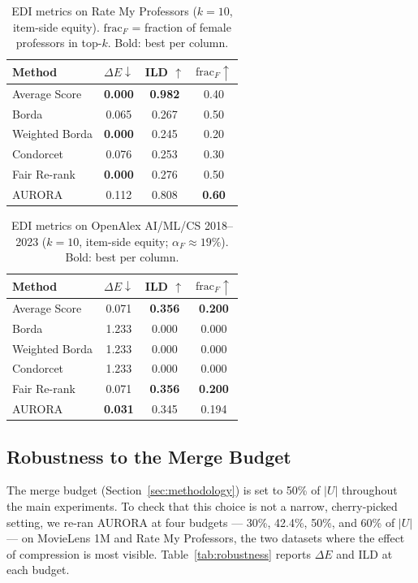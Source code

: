 \documentclass[a4paper,fleqn]{cas-dc}
\begin{document}
\begin{table}[h!]
\caption{EDI metrics on Rate My Professors ($k=10$, item-side equity).
$\mathrm{frac}_F$ = fraction of female professors in top-$k$.
Bold: best per column.}
\label{tab:rmp}
\centering
\begin{tabular}{lccc}
\hline
Method & $\Delta E \downarrow$ & ILD $\uparrow$ &
$\mathrm{frac}_F \uparrow$ \\
\hline
Average Score  & \textbf{0.000} & \textbf{0.982} & 0.40 \\
Borda          & 0.065 & 0.267 & 0.50 \\
Weighted Borda & \textbf{0.000} & 0.245 & 0.20 \\
Condorcet      & 0.076 & 0.253 & 0.30 \\
Fair Re-rank   & \textbf{0.000} & 0.276 & 0.50 \\
AURORA           & 0.112 & 0.808 & \textbf{0.60} \\
\hline
\end{tabular}
\end{table}
\begin{table}[h!]
\caption{EDI metrics on OpenAlex AI/ML/CS 2018--2023 ($k=10$, item-side equity;
$\alpha_F \approx 19\%$). Bold: best per column.}
\label{tab:oalex}
\centering
\begin{tabular}{lccc}
\hline
Method & $\Delta E \downarrow$ & ILD $\uparrow$ &
$\mathrm{frac}_F \uparrow$ \\
\hline
Average Score  & 0.071 & \textbf{0.356} & \textbf{0.200} \\
Borda          & 1.233 & 0.000 & 0.000 \\
Weighted Borda & 1.233 & 0.000 & 0.000 \\
Condorcet      & 1.233 & 0.000 & 0.000 \\
Fair Re-rank   & 0.071 & \textbf{0.356} & \textbf{0.200} \\
AURORA           & \textbf{0.031} & 0.345 & 0.194 \\
\hline
\end{tabular}
\end{table}

\subsection{Robustness to the Merge Budget}
\label{sec:robustness}

The merge budget (Section~\ref{sec:methodology}) is set to 50\% of $|U|$
throughout the main experiments. To check that this choice is not a
narrow, cherry-picked setting, we re-ran AURORA at four budgets — 30\%,
42.4\%, 50\%, and 60\% of $|U|$ — on MovieLens 1M and Rate My
Professors, the two datasets where the effect of compression is most
visible. Table~\ref{tab:robustness} reports $\Delta E$ and ILD at each
budget.
\end{document}
